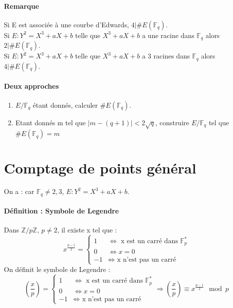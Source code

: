\documentclass[12pt,a4paper]{report}
\begin{document}
\paragraph{Remarque\\}
Si E est associée  à une courbe d'Edwards, $ 4 | \# E(\mathbb{F}_q) $. \\Si $ E:Y^2 = X^3+aX+b$ telle que $ X^3 +aX+b$ a une racine dans $\mathbb{F}_q $ alors $2 | \# E(\mathbb{F}_q) $.\\Si $ E:Y^2 = X^3+aX+b$ telle que $ X^3 +aX+b$ a 3 racines dans $\mathbb{F}_q $ alors $4 | \# E(\mathbb{F}_q) $.
\paragraph{Deux approches\\}
\begin{enumerate}
\item $E/\mathbb{F}_q $ étant donnés, calculer $\# E(\mathbb{F}_q) $.
\item Etant donnés m tel que $ |m-(q+1)| < 2\sqrt{q}$, construire $ E / \mathbb{F}_q $ tel que $ \# E(\mathbb{F}_q) = m$
\end{enumerate}
\section{Comptage de points général}
On a : car $\mathbb{F}_q \neq 2,3$, $E:Y^2=X^3 +aX+b$.
\paragraph{Définition : Symbole de Legendre\\}
Dans $ \mathbb{Z}/p\mathbb{Z} $, $p\neq 2$, il existe x tel que :
$$ x^{\frac{p-1}{2}}= \left\{\begin{array}{ll}
1 & \Longleftrightarrow \mbox{ x est un carré dans } \mathbb{F}_p^* \\
0 & \Longleftrightarrow x=0 \\
-1 & \Longleftrightarrow \mbox{ x n'est pas un carré}\end{array}\right.$$
On définit le symbole de Legendre : $$ \left(\frac{x}{p}\right) = \left\{\begin{array}{ll}
1 & \Longleftrightarrow \mbox{ x est un carré dans } \mathbb{F}_p^* \\
0 & \Longleftrightarrow x=0 \\
-1 & \Longleftrightarrow \mbox{ x n'est pas un carré}\end{array}\right. \Rightarrow \left(\frac{x}{p}\right) \equiv x^{\frac{p-1}{2}} \mod p $$
\end{document}
